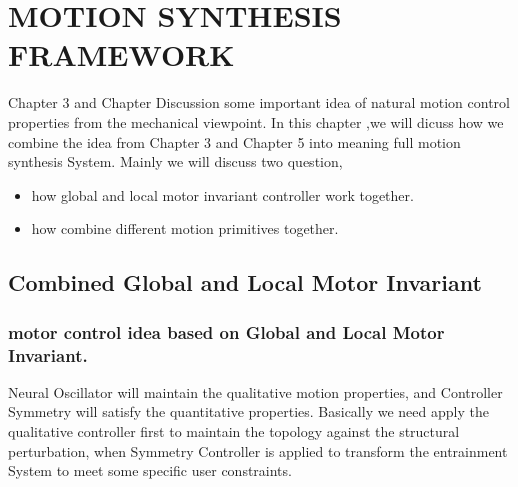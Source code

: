 \chapter {MOTION SYNTHESIS FRAMEWORK}
\label{chap:msf}
\ifpdf
    \graphicspath{{CombineFramework/CombineFrameworkFigs/PNG/}{CombineFramework/CombineFrameworkFigs/PDF/}{CombineFramework/CombineFrameworkFigs/}}
\else
    \graphicspath{{CombineFramework/CombineFrameworkFigs/EPS/}{CombineFramework/CombineFrameworkFigs/}}
\fi

Chapter 3 and Chapter Discussion some important idea of natural motion control properties from the mechanical viewpoint.
In this chapter ,we will dicuss how we combine the idea from Chapter 3 and Chapter 5 into meaning full motion synthesis System.
Mainly we will discuss two question,
\begin{itemize}
\item how global and local motor invariant controller work together.
\item how combine different motion primitives together.
\end{itemize}

\section{Combined Global and Local Motor Invariant}

\subsection{ motor control idea based on Global and Local  Motor Invariant.}

Neural Oscillator will maintain the qualitative motion properties, and Controller Symmetry will satisfy the quantitative properties.
Basically we need apply the qualitative controller first to maintain the topology against the structural perturbation, 
when Symmetry Controller is applied to transform the entrainment System to meet some specific user constraints.


